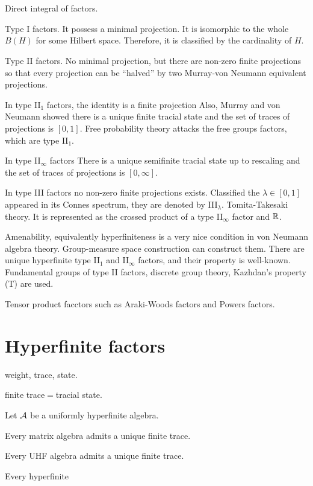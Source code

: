 \documentclass{../../large}
\begin{document}
\section{}


Direct integral of factors.

Type I factors.
It possess a minimal projection.
It is isomorphic to the whole $B(H)$ for some Hilbert space.
Therefore, it is classified by the cardinality of $H$.

Type II factors.
No minimal projection, but there are non-zero finite projections so that every projection can be ``halved'' by two Murray-von Neumann equivalent projections.

In type II$_1$ factors, the identity is a finite projection
Also, Murray and von Neumann showed there is a unique finite tracial state and the set of traces of projections is $[0,1]$.
Free probability theory attacks the free groups factors, which are type II$_1$.

In type II$_\infty$ factors
There is a unique semifinite tracial state up to rescaling and the set of traces of projections is $[0,\infty]$.

In type III factors no non-zero finite projections exists.
Classified the $\lambda\in[0,1]$ appeared in its Connes spectrum, they are denoted by III$_\lambda$.
Tomita-Takesaki theory.
It is represented as the crossed product of a type II$_\infty$ factor and $\mathbb{R}$.

Amenability, equivalently hyperfiniteness is a very nice condition in von Neumann algebra theory.
Group-measure space construction can construct them.
There are unique hyperfinite type II$_1$ and II$_\infty$ factors, and their property is well-known.
Fundamental groups of type II factors, discrete group theory, Kazhdan's property (T) are used.


Tensor product facctors such as Araki-Woods factors and Powers factors.

\section{Hyperfinite factors}

weight, trace, state.

finite trace$=$tracial state.

\begin{prb}
Let $\mathcal{A}$ be a uniformly hyperfinite algebra.
\begin{parts}
\item Every matrix algebra admits a unique finite trace.
\item Every UHF algebra admits a unique finite trace.
\item Every hyperfinite 
\end{parts}
\end{prb}
\end{document}
